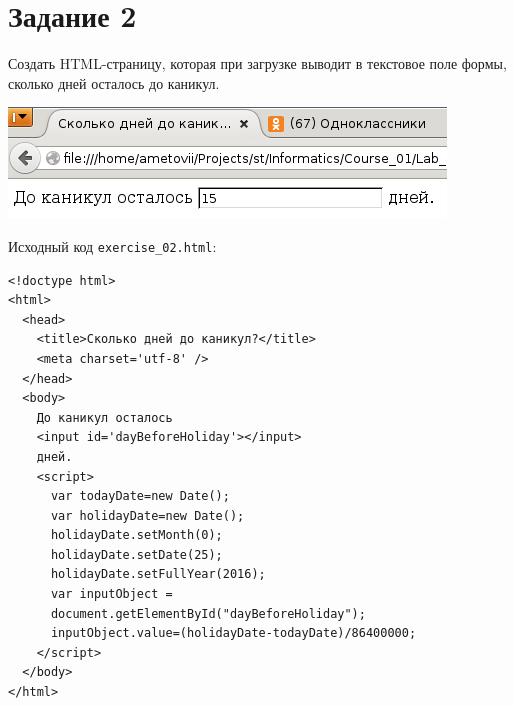 \section{Задание 2}

Создать HTML-страницу, которая при загрузке выводит в текстовое поле формы, сколько дней осталось до каникул.

\begin{center}
  \includegraphics{img/Exercise_02/01.png}
\end{center}

Исходный код \verb|exercise_02.html|:

\begin{verbatim}
<!doctype html>
<html>
  <head>
    <title>Сколько дней до каникул?</title>
    <meta charset='utf-8' />
  </head>
  <body>
    До каникул осталось
    <input id='dayBeforeHoliday'></input>
    дней.
    <script>
      var todayDate=new Date();
      var holidayDate=new Date();
      holidayDate.setMonth(0);
      holidayDate.setDate(25);
      holidayDate.setFullYear(2016);
      var inputObject =
	  document.getElementById("dayBeforeHoliday");
      inputObject.value=(holidayDate-todayDate)/86400000;
    </script>
  </body>
</html>
\end{verbatim}
